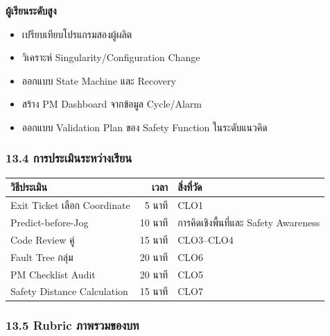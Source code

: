 \textbf{ผู้เรียนระดับสูง}

\begin{itemize}
    \item เปรียบเทียบโปรแกรมสองผู้ผลิต
    \item วิเคราะห์ Singularity/Configuration Change
    \item ออกแบบ State Machine และ Recovery
    \item สร้าง PM Dashboard จากข้อมูล Cycle/Alarm
    \item ออกแบบ Validation Plan ของ Safety Function ในระดับแนวคิด
\end{itemize}

\subsubsection{13.4 การประเมินระหว่างเรียน}

\begin{table}[htbp]
    \centering
    \begin{tabular}{l r l}
        \hline
        \textbf{วิธีประเมิน} & \textbf{เวลา} & \textbf{สิ่งที่วัด} \\
        \hline
        Exit Ticket เลือก Coordinate & 5 นาที & CLO1 \\
        Predict-before-Jog & 10 นาที & การคิดเชิงพื้นที่และ Safety Awareness \\
        Code Review คู่ & 15 นาที & CLO3–CLO4 \\
        Fault Tree กลุ่ม & 20 นาที & CLO6 \\
        PM Checklist Audit & 20 นาที & CLO5 \\
        Safety Distance Calculation & 15 นาที & CLO7 \\
        \hline
    \end{tabular}
\end{table}

\subsubsection{13.5 Rubric ภาพรวมของบท}

